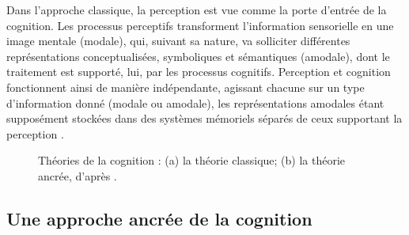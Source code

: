 Dans l'approche classique, la perception est vue comme la porte d'entrée de la cognition. Les processus perceptifs transforment l'information sensorielle en une image mentale (modale), qui, suivant sa nature, va solliciter différentes représentations conceptualisées, symboliques et sémantiques (amodale), dont le traitement est supporté, lui, par les processus cognitifs. Perception et cognition fonctionnent ainsi de manière indépendante, agissant chacune sur un type d'information donné (modale ou amodale), les représentations amodales étant supposément stockées dans des systèmes mémoriels séparés de ceux supportant la perception \citep{barsalou2008grounded}.

\begin{figure}[t]
         \myfloatalign
         \par
        \caption[Théories de la cognition.]{Théories de la cognition : (a) la théorie classique; (b) la théorie ancrée, d'après \citep{barsalou1999perceptions}.}
        \label{fig:appCog}
\end{figure}

\subsection{Une approche ancrée de la cognition}
\label{sec:ch3_groundedCognition}
 
